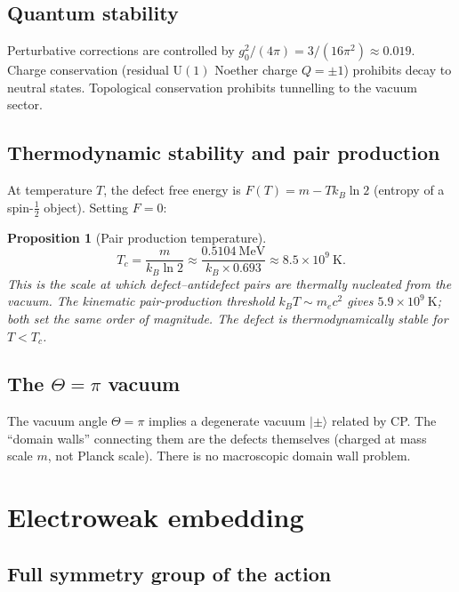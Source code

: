 \documentclass[12pt]{article}
\newtheorem{proposition}[theorem]{Proposition}
\theoremstyle{definition}
\theoremstyle{remark}
\begin{document}
\subsection{Quantum stability}

Perturbative corrections are controlled by $g_0^2/(4\pi)=3/(16\pi^2)\approx
0.019$.  Charge conservation (residual $\mathrm{U}(1)$ Noether charge $Q=\pm 1$)
prohibits decay to neutral states.  Topological conservation prohibits
tunnelling to the vacuum sector.

\subsection{Thermodynamic stability and pair production}

At temperature $T$, the defect free energy is
$F(T)=m-Tk_B\ln 2$ (entropy of a spin-$\tfrac{1}{2}$ object).
Setting $F=0$:

\begin{proposition}[Pair production temperature]
\begin{equation}
T_c=\frac{m}{k_B\ln 2}\approx\frac{0.5104\ \mathrm{MeV}}{k_B\times 0.693}
\approx 8.5\times 10^9\ \mathrm{K}.
\end{equation}
This is the scale at which defect--antidefect pairs are thermally nucleated
from the vacuum.  The kinematic pair-production threshold
$k_BT\sim m_ec^2$ gives $5.9\times 10^9\ \mathrm{K}$; both
set the same order of magnitude.  The defect is thermodynamically stable
for $T<T_c$.
\end{proposition}

\subsection{The $\Theta=\pi$ vacuum}

The vacuum angle $\Theta=\pi$ implies a degenerate vacuum
$|\pm\rangle$ related by CP.  The ``domain walls'' connecting them are
the defects themselves (charged at mass scale $m$, not Planck scale).
There is no macroscopic domain wall problem.

\section{Electroweak embedding}
\label{sec:ew}

\subsection{Full symmetry group of the action}
\end{document}
